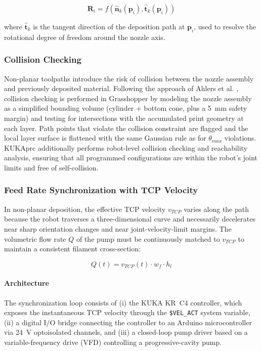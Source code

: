 \documentclass[conference]{IEEEtran}
\begin{document}
\begin{equation}
    \mathbf{R}_i = f(\hat{\mathbf{n}}_k(\mathbf{p}_i), \hat{\mathbf{t}}_k(\mathbf{p}_i))
    \label{eq:orientation}
\end{equation}

\noindent where $\hat{\mathbf{t}}_k$ is the tangent direction of the deposition path at $\mathbf{p}_i$, used to resolve the rotational degree of freedom around the nozzle axis.

\subsubsection{Collision Checking}

Non-planar toolpaths introduce the risk of collision between the nozzle assembly and previously deposited material. Following the approach of Ahlers et al. \cite{ahlers_3d_2019}, collision checking is performed in Grasshopper by modeling the nozzle assembly as a simplified bounding volume (cylinder + bottom cone, plus a 5~mm safety margin) and testing for intersections with the accumulated print geometry at each layer. Path points that violate the collision constraint are flagged and the local layer surface is flattened with the same Gaussian rule as for $\theta_{max}$ violations. KUKA\textbar prc additionally performs robot-level collision checking and reachability analysis, ensuring that all programmed configurations are within the robot's joint limits and free of self-collision.

\subsubsection{Feed Rate Synchronization with TCP Velocity}
\label{subsec:sync}

In non-planar deposition, the effective TCP velocity $v_{TCP}$ varies along the path because the robot traverses a three-dimensional curve and necessarily decelerates near sharp orientation changes and near joint-velocity-limit margins. The volumetric flow rate $Q$ of the pump must be continuously matched to $v_{TCP}$ to maintain a consistent filament cross-section:

\begin{equation}
    Q(t) = v_{TCP}(t) \cdot w_f \cdot h_l
    \label{eq:flow_sync}
\end{equation}

\paragraph{Architecture} The synchronization loop consists of (i) the KUKA KR~C4 controller, which exposes the instantaneous TCP velocity through the \texttt{\$VEL\_ACT} system variable, (ii) a digital I/O bridge connecting the controller to an Arduino microcontroller via 24~V optoisolated channels, and (iii) a closed-loop pump driver based on a variable-frequency drive (VFD) controlling a progressive-cavity pump.
\end{document}

